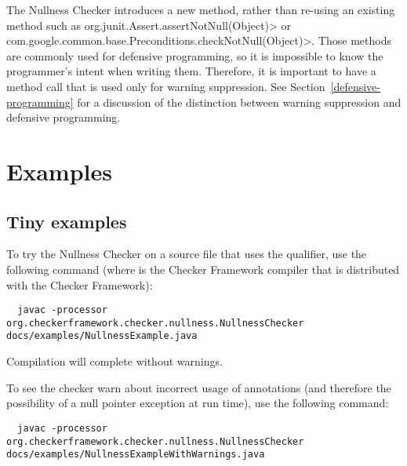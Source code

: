 \begin{sloppypar}
The Nullness Checker introduces a new method, rather than re-using an
existing method such as \<org.junit.Assert.assertNotNull(Object)> or
\<com.google.common.base.Preconditions.checkNotNull(Object)>.  Those
methods are commonly used for defensive programming, so it is impossible to
know the programmer's intent when writing them.  Therefore, it is important to
have a method call that is used only for warning suppression.  See
Section~\ref{defensive-programming} for a discussion of
the distinction between warning suppression and defensive programming.
\end{sloppypar}


\section{Examples\label{nullness-example}}

\subsection{Tiny examples\label{nullness-tiny-examples}}

To try the Nullness Checker on a source file that uses the  qualifier,
use the following command (where  is the Checker Framework compiler that
is distributed with the Checker Framework):

\begin{smaller}
\begin{Verbatim}
  javac -processor org.checkerframework.checker.nullness.NullnessChecker docs/examples/NullnessExample.java
\end{Verbatim}
\end{smaller}

\noindent
Compilation will complete without warnings.

To see the checker warn about incorrect usage of annotations (and therefore the
possibility of a null pointer exception at run time), use the following command:

\begin{mysmall}
\begin{Verbatim}
  javac -processor org.checkerframework.checker.nullness.NullnessChecker docs/examples/NullnessExampleWithWarnings.java
\end{Verbatim}
\end{mysmall}


